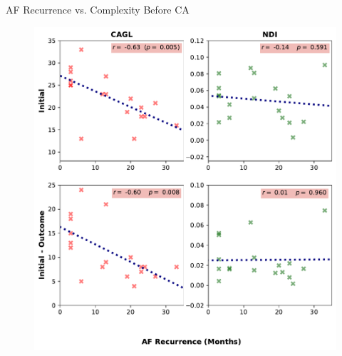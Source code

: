 \documentclass{beamer}
\begin{document}
	\begin{frame}{AF Recurrence vs. Complexity Before CA}
		
		\begin{figure}[h]
			\centering
			\includegraphics[scale=0.4]{figures/LR_2scenarios.pdf}
		\end{figure}
	\end{frame}
\end{document}

